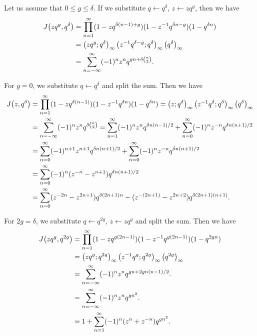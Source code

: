\documentclass{article}
\begin{document}
Let us assume that $0 \le g \le \delta$.
If we substitute $q \gets q^\delta$, $z \gets z q^g$, then we have
\begin{align*}
  J\!\left(zq^g,q^\delta\right)
  &=
  \prod_{n=1}^\infty
    (1-zq^{\delta (n-1)+g})
    (1-z^{-1}q^{\delta n-g})
    (1-q^{\delta n})
  \\
  &=
    \left( zq^g;q^\delta \right)_{\infty} \left( z^{-1}q^{\delta-g};q^\delta \right)_{\infty}
    \left({q}^{\delta}\right)_{\infty}
  \\
  &=
    \sum_{n=-\infty}^\infty (-1)^nz^nq^{gn + \delta \binom{n}{2}}.
\end{align*}

For $g=0$, we substitute $q \gets q^\delta$ and split the sum. Then we have
\begin{align}
  J\!\left(z,q^\delta\right)
  &=
  \prod_{n=1}^\infty
    (1-zq^{\delta (n-1)})
    (1-z^{-1}q^{\delta n})
    (1-q^{\delta n})
  =
    \left( z;q^\delta \right)_{\infty} \left( z^{-1}q^{\delta};q^\delta \right)_{\infty}
    \left({q}^{\delta}\right)_{\infty}
  \notag\\
  &=
    \sum_{n=-\infty}^\infty (-1)^nz^nq^{\delta \binom{n}{2}}
    =
    \sum_{n=1}^\infty (-1)^nz^nq^{\delta n(n-1)/2}
    +
    \sum_{n=0}^\infty (-1)^nz^{-n}q^{\delta n(n+1)/2}
  \notag\\
  &=
    \sum_{n=0}^\infty (-1)^{n+1}z^{n+1}q^{\delta n(n+1)/2}
    +
    \sum_{n=0}^\infty (-1)^nz^{-n}q^{\delta n(n+1)/2}
  \notag\\
  &=
    \sum_{n=0}^\infty (-1)^n(z^{-n}-z^{n+1})q^{\delta n(n+1)/2}
  \\
  &=
    \sum_{n=0}^\infty (z^{-2n}-z^{2n+1})q^{\delta (2n+1) n}
                   -(z^{-(2n+1)}-z^{2n+2})q^{\delta (2n+1) (n+1)}.
  \label{eq:Jacobi-g=0}
\end{align}

For $2g=\delta$, we substitute $q \gets q^{2g}$, $z \gets z q^g$ and
split the sum. Then we have
\begin{align}
  J\!\left(zq^g,q^{2g}\right)
  &=
  \prod_{n=1}^\infty
    (1-zq^{g(2n-1)})
    (1-z^{-1}q^{g(2n-1)})
    (1-q^{2 g n})
  \notag\\
  &=
    \left( zq^g;q^{2g} \right)_{\infty} \left( z^{-1}q^g;q^{2g} \right)_{\infty}
    \left({q}^{2g}\right)_{\infty}
  \notag\\
  &=
    \sum_{n=-\infty}^\infty (-1)^nz^nq^{gn + 2g n (n-1)/2}.
  \notag\\
  &=
    \sum_{n=-\infty}^\infty (-1)^nz^nq^{gn^2}.
  \\
  &=
    1 + \sum_{n=1}^\infty (-1)^n(z^n + z^{-n})q^{gn^2}.
  \label{eq:Jacobi-2g=delta}
\end{align}
\end{document}
